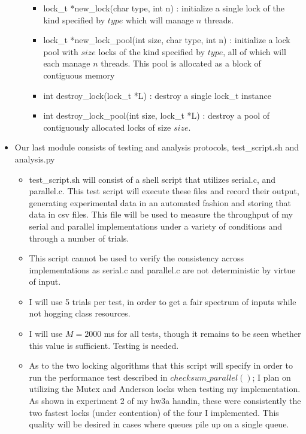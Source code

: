 \documentclass[]{article}
\begin{document}
\begin{itemize}
\begin{itemize}
		\begin{itemize}
			\item lock\_t *new\_lock(char type, int n) : initialize a single lock of the kind specified by $type$ which will manage $n$ threads.
			\item lock\_t *new\_lock\_pool(int size, char type, int n) : initialize a lock pool with $size$ locks of the kind specified by $type$, all of which will each manage $n$ threads. This pool is allocated as a block of contiguous memory
			\item int destroy\_lock(lock\_t *L) : destroy a single lock\_t instance
			\item int destroy\_lock\_pool(int size, lock\_t *L) : destroy a pool of contiguously allocated locks of size $size$.
		\end{itemize}
	\end{itemize}
	\item Our last module consists of testing and analysis protocols, test\_script.sh and analysis.py
	\begin{itemize}
		\item test\_script.sh will consist of a shell script that utilizes serial.c, and parallel.c. This test script will execute these files and record their output, generating experimental data in an automated fashion and storing that data in csv files. This file will be used to measure the throughput of my serial and parallel implementations under a variety of conditions and through a number of trials. 
		
		\item This script cannot be used to verify the consistency across implementations as serial.c and parallel.c are not deterministic by virtue of input. 
		
		\item I will use 5 trials per test, in order to get a fair spectrum of inputs while not hogging class resources.
		
		\item I will use $M = 2000$ ms for all tests, though it remains to be seen whether this value is sufficient. Testing is needed.

		\item As to the two locking algorithms that this script will specify in order to run the performance test described in $checksum\_parallel()$; I plan on utilizing the Mutex and Anderson locks when testing my implementation. As shown in experiment 2 of my hw3a handin, these were consistently the two fastest locks (under contention) of the four I implemented. This quality will be desired in cases where queues pile up on a single queue.
		

\end{itemize}
\end{itemize}
\end{document}
